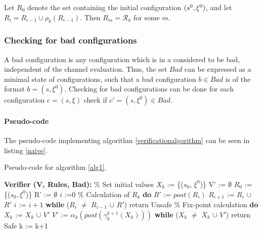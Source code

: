 Let $R_0$ denote the set containing the initial configuration $(s^0, \xi^0)$, and let $R_i = R_{i-1} \cup \rho_k(R_{i-1})$. Then $R_m = \mathcal{R}_k$ for some $m$.

\subsubsection{Checking for bad configurations}
\label{part3}
A bad configuration is any configuration which is in a  considered to be bad, independent of the channel evaluation. Thus, the set $Bad$ can be expressed as a minimal state of configurations, such that a bad configuration $b \in Bad$ is of the format $b = (s, \xi^0)$. Checking for bad configurations can be done for each configuration $c = (s, \xi)$ check if $c' = (s, \xi^0) \in Bad$.


\paragraph{Pseudo-code}
The pseudo-code implementing algorithm \ref{verificationalgorithm} can be seen in listing \ref{naive}. 

\begin{algorithm}
  \caption{Pseudo-code for algorithm \ref{alg1}.}
	\label{naive}
  \begin{algorithmic}[1]
    \State \textbf{Verifier (V, Rules, Bad):}
	\State \% Set initial values
	\State $X_k$ := \{($s_0$, $\xi^0$)\}
	\State V' := $\emptyset$
	\State $R_0$ := \{($s_0, \xi^0$)\}
	\State R' := $\emptyset$
	\State $i$ :=$0$
	\State
	\State \% Calculation of $R_k$
	\State \textbf{do}
        \State \hspace{10pt} $R'$ := $post(R_i)$
	\State \hspace{10pt} $R_{i+1}$ := $R_i$ $\cup$ $R'$
	\State \hspace{10pt} $i$ := $i+1$
	\State \textbf{while} ($R_i$ $\neq$ $R_{i-1}$ $\cup$ $R'$)
        \State return Unsafe
        \EndIf 
	\State 
	\State \% Fix-point calculation
	\State \textbf{do}
	\State \hspace{10pt} $X_k$ := $X_k$ $\cup$ $V'$
        \State \hspace{10pt} $V'$ := $\alpha_k(post(\gamma_k^{k+1}(X_k)))$
	\State \hspace{10pt} \textbf{while} ($X_k$ $\neq$ $X_k$ $\cup$ $V'$)
        \State return Safe
        \EndIf
        \State k := k+1
      \EndFor
\end{algorithmic}
\end{algorithm}

